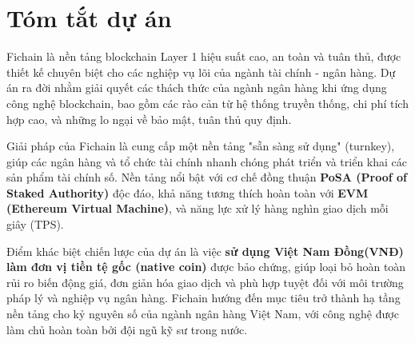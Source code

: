 \section{Tóm tắt dự án}
Fichain là nền tảng blockchain Layer 1 hiệu suất cao, an toàn và tuân thủ, được thiết kế chuyên biệt cho các nghiệp vụ lõi của ngành tài chính - ngân hàng. Dự án ra đời nhằm giải quyết các thách thức của ngành ngân hàng khi ứng dụng công nghệ blockchain, bao gồm các rào cản từ hệ thống truyền thống, chi phí tích hợp cao, và những lo ngại về bảo mật, tuân thủ quy định.

Giải pháp của Fichain là cung cấp một nền tảng "sẵn sàng sử dụng" (turnkey), giúp các ngân hàng và tổ chức tài chính nhanh chóng phát triển và triển khai các sản phẩm tài chính số. Nền tảng nổi bật với cơ chế đồng thuận \textbf{PoSA (Proof of Staked Authority)}\cite{BinanceAcademy_PoSA} độc đáo, khả năng tương thích hoàn toàn với \textbf{EVM (Ethereum Virtual Machine)}\cite{wood2014ethereum}, và năng lực xử lý hàng nghìn giao dịch mỗi giây (TPS).

Điểm khác biệt chiến lược của dự án là việc \textbf{sử dụng Việt Nam Đồng(VNĐ) làm đơn vị tiền tệ gốc (native coin)} được bảo chứng, giúp loại bỏ hoàn toàn rủi ro biến động giá, đơn giản hóa giao dịch và phù hợp tuyệt đối với môi trường pháp lý và nghiệp vụ ngân hàng. Fichain hướng đến mục tiêu trở thành hạ tầng nền tảng cho kỷ nguyên số của ngành ngân hàng Việt Nam, với công nghệ được làm chủ hoàn toàn bởi đội ngũ kỹ sư trong nước.
